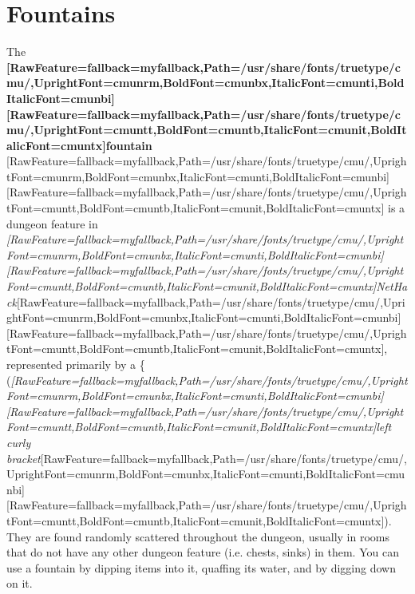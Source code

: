 \chapter{Fountains}
The {\bfseries \allowbreak{}\setmainfont{cmunbx.ttf}[RawFeature={fallback=myfallback},Path=/usr/share/fonts/truetype/cmu/,UprightFont=cmunrm,BoldFont=cmunbx,ItalicFont=cmunti,BoldItalicFont=cmunbi]\setmonofont{cmunbx.ttf}[RawFeature={fallback=myfallback},Path=/usr/share/fonts/truetype/cmu/,UprightFont=cmuntt,BoldFont=cmuntb,ItalicFont=cmunit,BoldItalicFont=cmuntx]\bfseries fountain}{$\text{ }$}\allowbreak{}\setmainfont{cmunrm.ttf}[RawFeature={fallback=myfallback},Path=/usr/share/fonts/truetype/cmu/,UprightFont=cmunrm,BoldFont=cmunbx,ItalicFont=cmunti,BoldItalicFont=cmunbi]\setmonofont{cmunrm.ttf}[RawFeature={fallback=myfallback},Path=/usr/share/fonts/truetype/cmu/,UprightFont=cmuntt,BoldFont=cmuntb,ItalicFont=cmunit,BoldItalicFont=cmuntx] is a dungeon feature\footnotemark[25] in {\itshape \allowbreak{}\setmainfont{cmunti.ttf}[RawFeature={fallback=myfallback},Path=/usr/share/fonts/truetype/cmu/,UprightFont=cmunrm,BoldFont=cmunbx,ItalicFont=cmunti,BoldItalicFont=cmunbi]\setmonofont{cmunti.ttf}[RawFeature={fallback=myfallback},Path=/usr/share/fonts/truetype/cmu/,UprightFont=cmuntt,BoldFont=cmuntb,ItalicFont=cmunit,BoldItalicFont=cmuntx]\itshape NetHack\footnotemark[26]}\allowbreak{}\setmainfont{cmunrm.ttf}[RawFeature={fallback=myfallback},Path=/usr/share/fonts/truetype/cmu/,UprightFont=cmunrm,BoldFont=cmunbx,ItalicFont=cmunti,BoldItalicFont=cmunbi]\setmonofont{cmunrm.ttf}[RawFeature={fallback=myfallback},Path=/usr/share/fonts/truetype/cmu/,UprightFont=cmuntt,BoldFont=cmuntb,ItalicFont=cmunit,BoldItalicFont=cmuntx], represented primarily by a \{ ({\itshape \allowbreak{}\setmainfont{cmunti.ttf}[RawFeature={fallback=myfallback},Path=/usr/share/fonts/truetype/cmu/,UprightFont=cmunrm,BoldFont=cmunbx,ItalicFont=cmunti,BoldItalicFont=cmunbi]\setmonofont{cmunti.ttf}[RawFeature={fallback=myfallback},Path=/usr/share/fonts/truetype/cmu/,UprightFont=cmuntt,BoldFont=cmuntb,ItalicFont=cmunit,BoldItalicFont=cmuntx]\itshape left curly bracket}\allowbreak{}\setmainfont{cmunrm.ttf}[RawFeature={fallback=myfallback},Path=/usr/share/fonts/truetype/cmu/,UprightFont=cmunrm,BoldFont=cmunbx,ItalicFont=cmunti,BoldItalicFont=cmunbi]\setmonofont{cmunrm.ttf}[RawFeature={fallback=myfallback},Path=/usr/share/fonts/truetype/cmu/,UprightFont=cmuntt,BoldFont=cmuntb,ItalicFont=cmunit,BoldItalicFont=cmuntx]). They are found randomly scattered throughout the dungeon, usually in rooms that do not have any other dungeon feature\footnotemark[27] (i.e. chests\footnotemark[28], sinks\footnotemark[29]) in them. You can use a fountain by dipping items into it, quaffing\footnotemark[30] its water, and by digging down on it.


